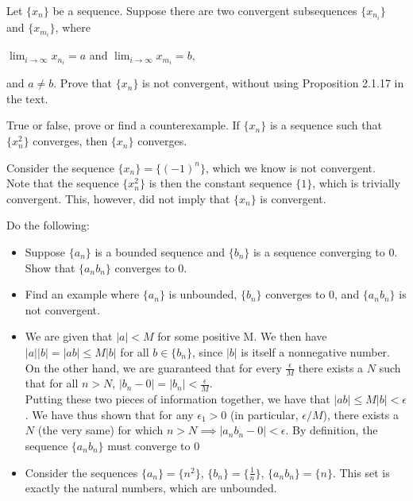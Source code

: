 \documentclass[11 pt]{article}
\begin{document}
\pagebreak
\begin{problem}
Let $\{x_n\}$ be a sequence. Suppose there are two convergent subsequences $\{x_n_i\}$ and $\{x_m_i\}$, where\\
\begin{center}
	$\lim_{i\to\infty}x_n_i=a$ and $\lim_{i\to\infty}x_m_i=b,$
\end{center}
and $a\neq b$. Prove that $\{x_n\}$ is not convergent, without using Proposition 2.1.17 in the text.
\end{problem}
\begin{solution}
\end{solution}
\pagebreak
\begin{problem}
	True or false, prove or find a counterexample. If $\{x_n\}$ is a sequence such that $\{x_n^2\}$ converges, then $\{x_n\}$ converges.
\end{problem}
\begin{solution}
	Consider the sequence $\{x_n\}=\{(-1)^n\}$, which we know is not convergent.\\
	Note that the sequence $\{x_n^2\}$ is then the constant sequence $\{1\}$, which is trivially convergent. This, however, did not imply that $\{x_n\}$ is convergent.
\end{solution}
\pagebreak
\begin{problem}
	Do the following:
	\begin{itemize}
	\item Suppose $\{a_n\}$ is a bounded sequence and $\{b_n\}$ is a sequence converging to 0. Show that $\{a_nb_n\}$ converges to 0.
	\item Find an example where $\{a_n\}$ is unbounded, $\{b_n\}$ converges to 0, and $\{a_nb_n\}$ is not convergent.
	\end{itemize}
\end{problem}
\begin{solution}
	\begin{itemize}
		\item We are given that $|a|<M$ for some positive M.
		We then have $|a||b|=|ab|\leq M|b|$ for all  $b\in\{b_n\}$, since $|b|$ is itself a nonnegative number.\\
		On the other hand, we are guaranteed that for every $\frac{\epsilon}{M}$ there exists a $N$ such that for all $n>N$, $|b_n-0|=|b_n|<\frac{\epsilon}{M}$.\\
		Putting these two pieces of information together, we have that $|ab|\leq M|b|<\epsilon$.
		We have thus shown that for any  $\epsilon_1 >0$ (in particular, $\epsilon/M$), there exists a $N$ (the very same) for which $n>N\implies|a_nb_n-0|<\epsilon$.
		By definition, the sequence $\{a_nb_n\}$ must converge to 0
		\item Consider the sequences $\{a_n\}=\{n^2\}$, $\{b_n\}=\{\frac{1}{n}\}$, $\{a_nb_n\}=\{n\}$. This set is exactly the natural numbers, which are unbounded.
	\end{itemize}
\end{solution}
\end{document}
